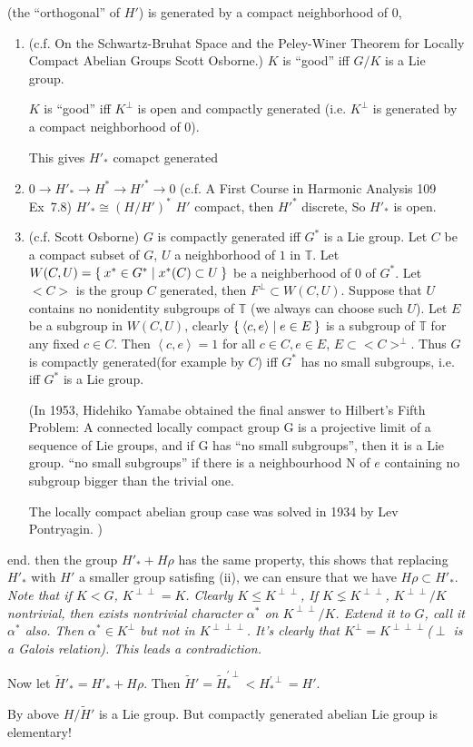 \documentclass[12pt]{amsart}
\newenvironment{expl}{\it}{\color{black}\normalsize}
\def\bT{{\mathbb{T}}}
\def\inn#1#2{\left\langle{#1},{#2}\right\rangle}
\begin{document}
(the ``orthogonal'' of $H'$) is generated by a compact neighborhood of $0$, 
\begin{expl}
\begin{enumerate}[(1)]
\item
(c.f. On the Schwartz-Bruhat Space and the Peley-Winer Theorem 
for Locally Compact Abelian Groups Scott Osborne.)
$K$ is ``good'' iff $G/K$ is a Lie group.

$K$ is ``good'' iff $K^\perp$ is open and compactly generated
(i.e. $K^\perp$ is generated by a compact neighborhood of $0$).

This gives $H'_*$ comapct generated
\item
$0\to H'_* \to H^* \to H'^* \to 0$ 
(c.f. A First Course in Harmonic Analysis 109 Ex~7.8)
$H'_* \cong (H/H')^*$
$H'$ compact, then $H'^*$ discrete, So $H'_*$ is open.
\item (c.f. Scott Osborne)
$G$ is compactly generated iff $G^*$ is a Lie group.
\proof
Let $C$ be a compact subset of $G$, $U$ a neighborhood of $1$ in $\bT$. 
Let $W(C,U) = \Set{x^*\in G^*| x^*(C)\subset U}$ 
be a neighberhood of $0$ of $G^*$.
Let $<C>$ is the group $C$ generated, then $F^\perp \subset W(C,U)$. 
Suppose that $U$ contains no nonidentity subgroups of $\bT$
(we always can choose such $U$).
Let $E$ be a subgroup in $W(C,U)$, 
clearly $\Set{\inn{c}{e}|e\in E}$ is a subgroup of $\bT$ for any fixed $c\in C$.
Then $\inn{c}{e}=1$ for all $c\in C, e\in E$, $E \subset <C>^\perp$.
Thus $G$ is compactly generated(for example by $C$) iff $G^*$ has
no small subgroups, i.e. iff $G^*$ is a Lie group. 

(In 1953, Hidehiko Yamabe obtained the final answer to Hilbert’s Fifth Problem: 
A connected locally compact group G is 
a projective limit of a sequence of Lie groups,
and if G has ``no small subgroups'', then it is a Lie group.
``no small subgroups''  if there is a neighbourhood N of $e$
 containing no subgroup bigger than the trivial one.

The locally compact abelian group case was solved in 1934 by Lev Pontryagin. )
\end{enumerate}
end.
\end{expl}
then the group $H'_* +H\rho$ has the same property, 
this shows that replacing $H'_*$ with $H'$  a smaller group satisfing (ii),
 we can ensure that we have $H\rho \subset H'_*$. 
\begin{expl}
Note that if $K<G$, $K^{\perp\perp} = K$.
Clearly $K \leq K^{\perp\perp}$, If $K\lneq K^{\perp\perp}$,
 $K^{\perp\perp}/K$ nontrivial, then exists nontrivial 
character $\alpha^*$ on $K^{\perp\perp}/K$. 
Extend it to $G$, call it $\alpha^*$ also.
Then $\alpha^* \in K^\perp$ but not in $K^{\perp\perp\perp}$.
It's clearly that $K^\perp = K^{\perp\perp\perp}$($\perp$ is a Galois relation).
This leads a contradiction.

Now let  $\tilde{H}'_*=H'_* + H\rho$.
Then $\tilde{H}' = \tilde{H}_*^{'\perp} < H_*^{'\perp} = H'$.

By above $H/\tilde{H}'$ is a Lie group. But 
compactly generated abelian Lie group is elementary!
\end{expl}
\end{document}
